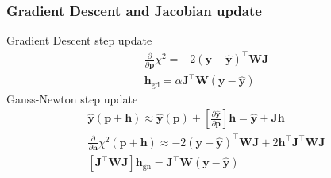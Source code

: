 \documentclass[]{beamer}
\begin{document}
\begin{frame}
    \frametitle{Gradient Descent and Jacobian update}
    Gradient Descent step update
    \begin{eqnarray*}
        \frac{\partial}{\partial \boldsymbol{p}} \chi^{2}
         = -2(\boldsymbol{y}-\hat{\boldsymbol{y}})^{\top} \boldsymbol{W} \boldsymbol{J} \\
        \boldsymbol{h}_{\mathrm{gd}}=\alpha \boldsymbol{J}^{\top} \boldsymbol{W}(\boldsymbol{y}-\hat{\boldsymbol{y}})
    \end{eqnarray*}
    Gauss-Newton step update
    \begin{eqnarray*}
        \hat{\boldsymbol{y}}(\boldsymbol{p}+\boldsymbol{h})
         \approx 
        \hat{\boldsymbol{y}}(\boldsymbol{p})
        + \left[
            \frac{\partial \hat{\boldsymbol{y}}}{\partial \boldsymbol{p}}
          \right] \boldsymbol{h}
          = \hat{\boldsymbol{y}}+\boldsymbol{J} \boldsymbol{h} \\
        \frac{\partial}{\partial \boldsymbol{h}}
         \chi^{2}(\boldsymbol{p}+\boldsymbol{h})
         \approx
         -2(\boldsymbol{y}-\hat{\boldsymbol{y}})^{\top}
        \boldsymbol{W} \boldsymbol{J}+2 \boldsymbol{h}^{\top} \boldsymbol{J}^{\top} \boldsymbol{W} \boldsymbol{J} \\
        \left[
            \boldsymbol{J}^{\top} \boldsymbol{W} \boldsymbol{J}
        \right] \boldsymbol{h}_{\mathrm{gn}}
        =\boldsymbol{J}^{\top} \boldsymbol{W}(\boldsymbol{y}-\hat{\boldsymbol{y}})
    \end{eqnarray*}
\end{frame}
\end{document}
